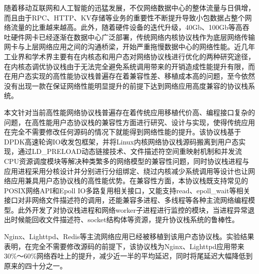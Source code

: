 \begin{cabstract}
随着移动互联网和人工智能的迅猛发展，不仅网络数据中心的整体流量与日俱增，而且由于RPC、HTTP、KV存储等业务的重要性不断提升导致小包数据占整个网络流量的比重越来越高。此外，随着硬件设备的迭代升级，40Gb、100Gb等高吞吐硬件网卡已经逐渐在数据中心广泛部署，传统网络内核协议栈作为底层网络传输网卡与上层网络应用之间的沟通桥梁，开始严重拖慢数据中心的网络性能。近几年工业界和学术界主要有在内核态和用户态对网络协议栈进行优化的两种研究途径，在内核态调优协议栈由于无法完全避免系统调用带来的开销造成性能提升有限，而在用户态实现的高性能协议栈普遍存在着兼容性差、移植成本高的问题，至今依然没有出现一款在保证网络性能明显提升的前提下达到网络应用高度兼容的协议栈系统。

本文针对当前高性能网络协议栈普遍存在着传统应用移植代价高、编程接口复杂的问题，在高性能用户态协议栈的兼容性方面进行研究、设计与实现，使得传统应用在完全不需要修改任何源码的情况下就能得到网络性能的提升。该协议栈基于DPDK高速轮询IO收发包框架，并将Linux内核网络协议栈源码搬离到用户态实现，通过LD\_PRELOAD动态链接技术、文件描述符空间重映射机制和并发流CPU资源调度模块等解决种类繁多的网络模型的兼容性问题，同时协议栈进程与应用进程采用分核设计并分别进行分组绑定、绕过内核减少系统调用等设计也让网络应用兼具用户态协议栈的高性能优势。在兼容性方面，本协议栈既支持常见的POSIX网络API和Epoll IO多路复用相关接口，又能支持read、epoll\_wait等相关接口对非网络文件描述符的调用，还能兼容多进程、多线程等各种主流网络编程模型。此外开发了对协议栈进程和网络worker子进程进行监控的模块，当进程异常退出时候能回收文件描述符、socket结构体等资源，提升协议栈系统的鲁棒性。

Nginx、Lighttpd、Redis等主流网络应用已经被移植到该用户态协议栈。实验结果表明，在完全不需要修改源码的前提下，该协议栈为Nginx、Lighttpd应用带来30\%～60\%网络吞吐上的提升，减少近一半的平均延迟，同时将尾延迟大幅降低到原来的四十分之一。


\end{cabstract}


